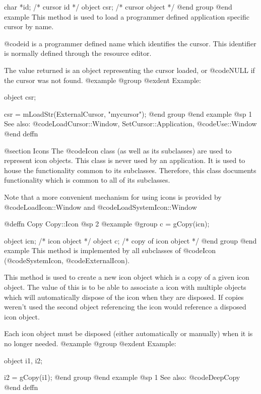 char    *id;    /*  cursor id      */
object   csr;   /*  cursor object  */
@end group
@end example
This method is used to load a programmer defined application specific
cursor by name.

@code{id} is a programmer defined name which identifies the cursor.
This identifier is normally defined through the resource editor.

The value returned is an object representing the cursor loaded, or
@code{NULL} if the cursor was not found.
@example
@group
@exdent Example:

object  csr;

csr = mLoadStr(ExternalCursor, "mycursor");
@end group
@end example
@sp 1
See also:  @code{LoadCursor::Window, SetCursor::Application,}
        @code{Use::Window}
@end deffn




@section Icons
The @code{Icon} class (as well as its subclasses) are used to represent
icon objects.  This class is never used by an application.  It is used
to house the functionality common to its subclasses.  Therefore, this
class documents functionality which is common to all of its subclasses.

Note that a more convenient mechanism for using icons is provided by
@code{LoadIcon::Window} and @code{LoadSystemIcon::Window}









@deffn {Copy} Copy::Icon
@sp 2
@example
@group
c = gCopy(icn);

object  icn;    /*  icon object          */
object  c;      /*  copy of icon object  */
@end group
@end example
This method is implemented by all subclasses of @code{Icon}
(@code{SystemIcon}, @code{ExternalIcon}).

This method is used to create a new icon object which is a copy of a
given icon object.  The value of this is to be able to associate a
icon with multiple objects which will automatically dispose of the
icon when they are disposed.  If copies weren't used the second object
referencing the icon would reference a disposed icon object.

Each icon object must be disposed (either automatically or manually)
when it is no longer needed.
@example
@group
@exdent Example:

object  i1, i2;

i2 = gCopy(i1);
@end group
@end example
@sp 1
See also:  @code{DeepCopy}
@end deffn










